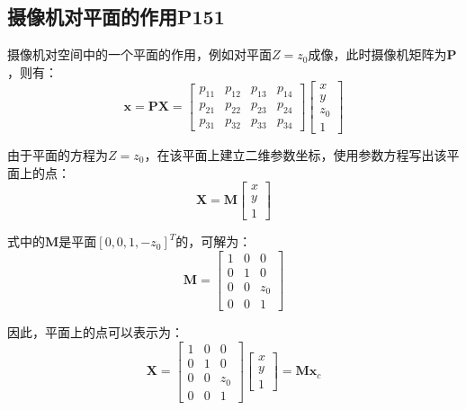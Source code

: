 \documentclass[11pt]{article}
\begin{document}
\subsection{摄像机对平面的作用P151}
摄像机对空间中的一个平面的作用，例如对平面$Z=z_0$成像，此时摄像机矩阵为$\mathbf{P}$，则有：
\begin{equation*}
  \mathbf{x}=\mathbf{P}\mathbf{X}=\begin{bmatrix}
    p_{11} & p_{12} & p_{13} & p_{14} \\
    p_{21} & p_{22} & p_{23} & p_{24} \\
    p_{31} & p_{32} & p_{33} & p_{34}
  \end{bmatrix}\begin{bmatrix}
    x \\y\\z_0\\1
  \end{bmatrix}
\end{equation*}\par
由于平面的方程为$Z=z_0$，在该平面上建立二维参数坐标，使用参数方程写出该平面上的点：
\begin{equation*}
  \mathbf{X}=\mathbf{M}\begin{bmatrix}
    x \\y\\1
  \end{bmatrix}
\end{equation*}\par
式中的$\mathbf{M}$是平面$[0,0,1,-z_0]^T$的，可解为：
\begin{equation*}
  \mathbf{M}=\begin{bmatrix}
    1 & 0 & 0   \\
    0 & 1 & 0   \\
    0 & 0 & z_0 \\
    0 & 0 & 1
  \end{bmatrix}
\end{equation*}\par
因此，平面上的点可以表示为：
\begin{equation*}
  \mathbf{X}=\begin{bmatrix}
    1 & 0 & 0   \\
    0 & 1 & 0   \\
    0 & 0 & z_0 \\
    0 & 0 & 1
  \end{bmatrix}\begin{bmatrix}
    x \\y\\1
  \end{bmatrix}=\mathbf{Mx}_c
\end{equation*}\par
\end{document}
